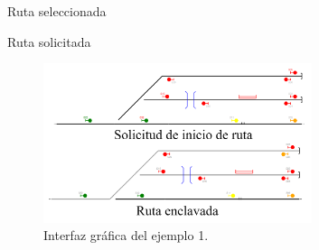 	
	Ruta seleccionada
	
	Ruta solicitada
	
	\begin{figure}[H]
		\centering
		\includegraphics[width=0.7\textwidth]{AGG/images/AGG_routes}
		\centering\caption{Interfaz gráfica del ejemplo 1.}
		\label{fig:AGG_routes}
	\end{figure}
	
		
	
	



	